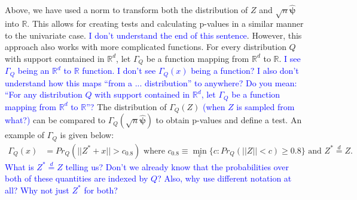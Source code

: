 \documentclass{article}
\newcommand{\disto}{P}
\newcommand{\rvv}{Z}
\newcommand{\distv}{Q}
\begin{document}
Above, we have used a norm to transform both the distribution of $\rvv$ and $\sqrt{n}\hat{\boldsymbol{\psi}}$ into $\mathbb{R}$.  This allows for creating tests and calculating p-values in a similar manner to the univariate case. 
\textcolor{blue}{I don't understand the end of this sentence}.
However, this approach also works with more complicated functions.  For every distribution $\distv$ with support conntained in $\mathbb{R}^d$, let $\Gamma_{\distv}$ be a function mapping from  $\mathbb{R}^d$ to $\mathbb{R}$.
\textcolor{blue}{I see $\Gamma_{\distv}$ being an $\mathbb{R}^d$ to $\mathbb{R}$ function. I don't see $\Gamma_Q(x)$ being a function? I also don't understand how this maps ``from a ... distribution'' to anywhere? Do you mean: ``For any distribution $Q$ with support contained in $\mathbb{R}^d$, let $\Gamma_Q$ be a function mapping from $\mathbb{R}^d$ to $\mathbb{R}$''?}
The distribution of $\Gamma_\distv(\rvv)$
\textcolor{blue}{(when $Z$ is sampled from what?)}
can be compared to $\Gamma_\distv(\sqrt{n}\hat{\boldsymbol{\psi}})$ to obtain p-values and define a test. An example of $\Gamma_\distv$ is given below:
\begin{align*}
	\Gamma_\distv(x) &= Pr_\distv(||\rvv^* + x|| > c_{0.8})  \text{ where }  c_{0.8} \equiv \min_{c}\{c : Pr_\distv(||\rvv|| < c) \geq 0.8 \} \text{ and } \rvv^* \overset{d}{=} \rvv.
\end{align*}
\textcolor{blue}{What is $\rvv^* \overset{d}{=} \rvv$ telling us? Don't we already know that the probabilities over both of these quantities are indexed by $Q$? Also, why use different notation at all? Why not just $\rvv^*$ for both?}
\end{document}
